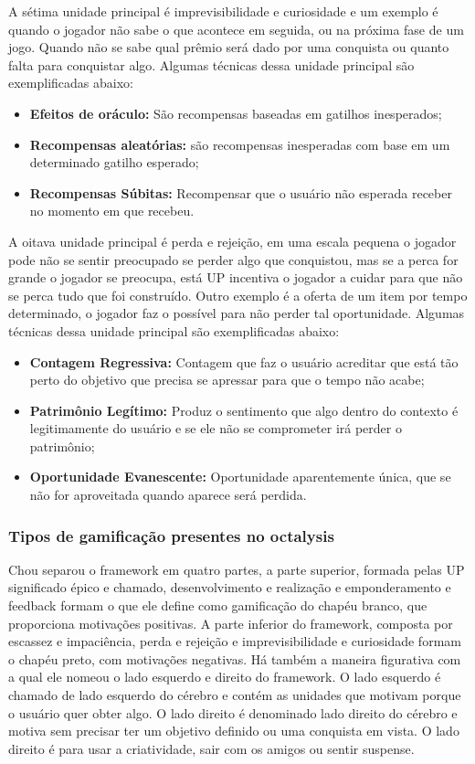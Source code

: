 A sétima unidade principal é imprevisibilidade e curiosidade e um exemplo é quando o jogador não sabe o que acontece em seguida, ou na próxima fase de um jogo. Quando não se sabe qual prêmio será dado por uma conquista ou quanto falta para conquistar algo. Algumas técnicas dessa unidade principal são exemplificadas abaixo:

\begin{itemize}
\item  \textbf{Efeitos de oráculo:} São recompensas baseadas em gatilhos inesperados;
\item  \textbf{Recompensas aleatórias:} são recompensas inesperadas com base em um determinado gatilho esperado;
\item  \textbf{Recompensas Súbitas:} Recompensar que o usuário não esperada receber no momento em que recebeu.
\end{itemize}

A oitava unidade principal é perda e rejeição, em uma escala pequena o jogador pode não se sentir preocupado se perder algo que conquistou, mas se a perca for grande o jogador se preocupa, está UP incentiva o jogador a cuidar para que não se perca tudo que foi construído. Outro exemplo é a oferta de um item por tempo determinado, o jogador faz o possível para não perder tal oportunidade. Algumas técnicas dessa unidade principal são exemplificadas abaixo:

\begin{itemize}
\item  \textbf{Contagem Regressiva:} Contagem que faz o usuário acreditar que está tão perto do objetivo que precisa se apressar para que o tempo não acabe;
\item  \textbf{Patrimônio Legítimo:} Produz o sentimento que algo dentro do contexto é legitimamente do usuário e se ele não se comprometer irá perder o patrimônio;
\item  \textbf{Oportunidade Evanescente:} Oportunidade aparentemente única, que se não for aproveitada quando aparece será perdida.
\end{itemize}

\subsubsection{Tipos de gamificação presentes no octalysis}

Chou separou o framework em quatro partes, a parte superior, formada pelas UP significado épico e chamado, desenvolvimento e realização e emponderamento e feedback formam o que ele define como gamificação do chapéu branco, que proporciona motivações positivas. A parte inferior do framework, composta por escassez e impaciência, perda e rejeição e imprevisibilidade e curiosidade formam o chapéu preto, com motivações negativas. Há também a maneira figurativa com a qual ele nomeou o lado esquerdo e direito do framework. O lado esquerdo é chamado de lado esquerdo do cérebro e contém as unidades que motivam porque o usuário quer obter algo. O lado direito é denominado lado direito do cérebro e motiva sem precisar ter um objetivo definido ou uma conquista em vista. O lado direito é para usar a criatividade, sair com os amigos ou sentir suspense.

